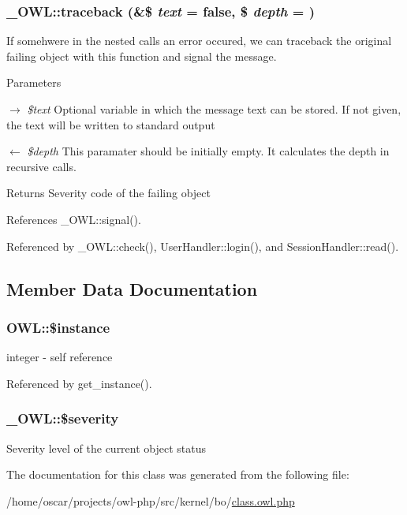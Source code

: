 \subsubsection[{traceback}]{\setlength{\rightskip}{0pt plus 5cm}\_\-OWL::traceback (\&\$ {\em text} = {\ttfamily false}, \/  \$ {\em depth} = {})}\label{class__OWL_aa29547995d6741b7d2b90c1d4ea99a13}
If somehwere in the nested calls an error occured, we can traceback the original failing object with this function and signal the message.


\begin{DoxyParams}{Parameters}
\item[\mbox{$\rightarrow$} {\em \$text}]Optional variable in which the message text can be stored. If not given, the text will be written to standard output \item[\mbox{$\leftarrow$} {\em \$depth}]This paramater should be initially empty. It calculates the depth in recursive calls. \end{DoxyParams}
\begin{DoxyReturn}{Returns}
Severity code of the failing object 
\end{DoxyReturn}


References \_\-OWL::signal().



Referenced by \_\-OWL::check(), UserHandler::login(), and SessionHandler::read().



\subsection{Member Data Documentation}
\subsubsection[{\$instance}]{\setlength{\rightskip}{0pt plus 5cm}OWL::\$instance}\label{classOWL_a0cb39c7fa9a2bd2e7d5b8ef6d7e81fa4}
integer -\/ self reference 

Referenced by get\_\-instance().

\subsubsection[{\$severity}]{\setlength{\rightskip}{0pt plus 5cm}\_\-OWL::\$severity}\label{class__OWL_ad26b40a9dbbacb33e299b17826f8327c}
Severity level of the current object status 

The documentation for this class was generated from the following file:\begin{DoxyCompactItemize}
\item 
/home/oscar/projects/owl-\/php/src/kernel/bo/\hyperlink{class_8owl_8php}{class.owl.php}\end{DoxyCompactItemize}
